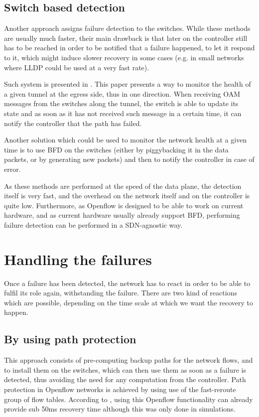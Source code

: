 \documentclass[]{IEEEtran}
\begin{document}
\subsection{Switch based detection}
Another approach assigns failure detection to the switches. While these methods are usually much faster, their main drawback is that later on the controller still has to be reached in order to be notified that a failure happened, to let it respond to it, which might induce slower recovery in some cases (e.g. in small networks where LLDP could be used at a very fast rate).

Such system is presented in \cite{6364688}. This paper presents a way to monitor the health of a given tunnel at the egress side, thus in one direction. When receiving OAM messages from the switches along the tunnel, the switch is able to update its state and as soon as it has not received such message in a certain time, it can notify the controller that the path has failed.

Another solution which could be used to monitor the network health at a given time is to use BFD\cite{rfc5880} on the switches (either by piggybacking it in the data packets, or by generating new packets) and then to notify the controller in case of error.

As these methods are performed at the speed of the data plane, the detection itself is very fast, and the overhead on the network itself and on the controller is quite low. Furthermore, as Openflow is designed to be able to work on current hardware, and as current hardware usually already support BFD, performing failure detection can be performed in a SDN-agnostic way.

\section{Handling the failures}
Once a failure has been detected, the network has to react in order to be able to fulfil its role again, withstanding the failure. There are two kind of reactions which are possible, depending on the time scale at which we want the recovery to happen.

\subsection{By using path protection}
This approach consists of pre-computing backup paths for the network flows, and to install them on the switches, which can then use them as soon as a failure is detected, thus avoiding the need for any computation from the controller. Path protection in Openflow networks is achieved by using use of the fast-reroute group of flow tables. According to \cite{Sharma:2013:OMC:2445634.2445903}, using this Openflow functionality can already provide sub 50ms recovery time although this was only done in simulations.
\end{document}
